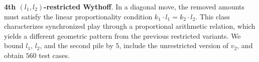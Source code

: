 \documentclass[review]{elsarticle}
\newcommand{\set}[1]{\{ #1 \}}
\newcommand{\tuple}[1]{\langle {#1} \rangle}
\newcommand{\true}{\top}
\newcommand{\statevar}{\mathcal{X}}
\newcommand{\act}{\mathcal{A}}
\newcommand{\constraint}{\mathcal{C}}
\newcommand{\estate}{\mathcal{E}}
\newcommand{\pre}{\mathtt{pre}}
\newcommand{\eff}{\mathtt{eff}}
\begin{document}
{\color{red}\textbf{4th $(l_1,l_2)$-restricted Wythoff}. In a diagonal move, the removed amounts must satisfy the linear proportionality condition $k_1 \cdot l_1 = k_2 \cdot l_2$.}
{\color{red}This class characterizes synchronized play through a proportional arithmetic relation, which yields a different geometric pattern from the previous restricted variants.}
{\color{red}We bound $l_1$, $l_2$, and the second pile by $5$, include the unrestricted version of $v_2$, and obtain $560$ test cases.}
\end{document}
